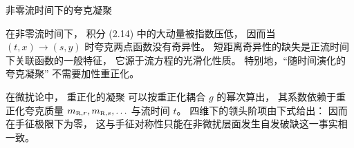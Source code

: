  非零流时间下的夸克凝聚

在非零流时间下，
积分 (2.14) 中的大动量被指数压低，
因而当 $(t,x)\to(s,y)$ 时夸克两点函数没有奇异性。
短距离奇异性的缺失是正流时间下关联函数的一般特征，
它源于流方程的光滑化性质。
特别地，``随时间演化的夸克凝聚''
不需要加性重正化。

在微扰论中，
重正化的凝聚
可以按重正化耦合 $g$ 的幂次算出，
其系数依赖于重正化夸克质量 $\mR{r},\mR{s},\ldots$
与流时间 $t$。
四维下的领头阶项由下式给出：
因而在手征极限下为零，
这与手征对称性只能在非微扰层面发生自发破缺这一事实相一致。
